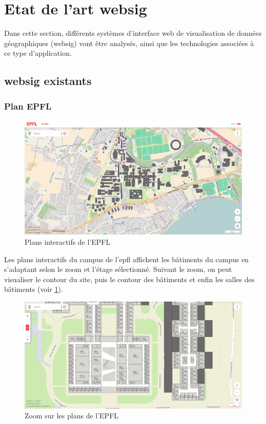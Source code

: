 \documentclass[
    iai, %
    il, %
]{heig-tb}
\begin{document}
\section{Etat de l'art \Gls{websig}}
Dans cette section, différents systèmes d'interface web de visualisation de données géographiques (\gls{websig}) vont être analysés, ainsi que les technologies
associées à ce type d'application.

\subsection{\Gls{websig} existants}

\subsubsection{Plan EPFL}
\begin{figure}[h]
    \centering
    \includegraphics[scale=0.7]{planEPFL.png}
    \caption{Plans interactifs de l'EPFL}
\end{figure}

Les plans interactifs du campus de l'\gls{epfl} \cite{plan-epfl} affichent les bâtiments du campus en s'adaptant selon le zoom et l'étage sélectionné.
Suivant le zoom, on peut visualiser le contour du site, puis le contour des bâtiments et enfin les salles des bâtiments (voir \ref{fig:EPFLZoom}).

\begin{figure}[h]
    \centering
    \includegraphics[scale=0.7]{planEPFLGrosPlan.png}
    \caption{Zoom sur les plans de l'EPFL }
    \label{fig:EPFLZoom}
\end{figure}
\end{document}
